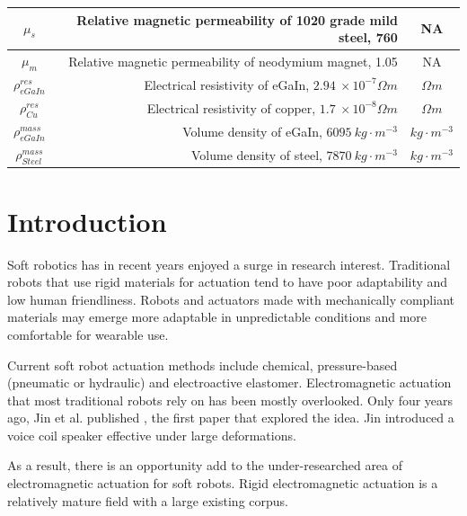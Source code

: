 \documentclass[a4paper,12pt]{article}
\begin{document}
\begin{center}
\begin{tabular}{c | D | c}
        \hline
        $\mu_s$ & Relative magnetic permeability of 1020 grade mild steel, 760 \cite{baartmanMaterialsLibraryFEMM2007} & NA \\
        \hline
        $\mu_m$ & Relative magnetic permeability of neodymium magnet, 1.05 \cite{engineeringtoolboxPermeability2016} & NA \\
        \hline
        $\rho^{res}_{eGaIn}$ & Electrical resistivity of eGaIn, $2.94\ \times10^{-7} \Omega m$ \cite{zrnicResistivitySurfaceTension1969} & $\Omega m$ \\
        \hline
        $\rho^{res}_{Cu}$ & Electrical resistivity of copper, $1.7\ \times10^{-8} \Omega m$ \cite{dickeyEutecticGalliumIndiumEGaIn2008} & $\Omega m$ \\
        \hline
        $\rho^{mass}_{eGaIn}$ & Volume density of eGaIn, $6095\ kg\cdot m^{-3}$\cite{xuEffectOxidationMechanical2012} & $kg\cdot m^{-3}$ \\
        \hline
        $\rho^{mass}_{Steel}$ & Volume density of steel, $7870\ kg\cdot m^{-3}$ \cite{saysAISI1020Carbon2013} & $kg\cdot m^{-3}$ \\
        \hline
    \end{tabular}
\end{center}

\newpage

\section{Introduction}

Soft robotics has in recent years enjoyed a surge in research interest. Traditional robots that use rigid materials for actuation tend to have poor adaptability and low human friendliness. Robots and actuators made with mechanically compliant materials may emerge more adaptable in unpredictable conditions and more comfortable for wearable use.

Current soft robot actuation methods include chemical, pressure-based (pneumatic or hydraulic) and electroactive elastomer. Electromagnetic actuation that most traditional robots rely on has been mostly overlooked. Only four years ago, Jin et al. published \cite{jinStretchableLoudspeakerUsing2015}, the first paper that explored the idea. Jin introduced a voice coil speaker effective under large deformations.

As a result, there is an opportunity add to the under-researched area of electromagnetic actuation for soft robots. Rigid electromagnetic actuation is a relatively mature field with a large existing corpus.
\end{document}
